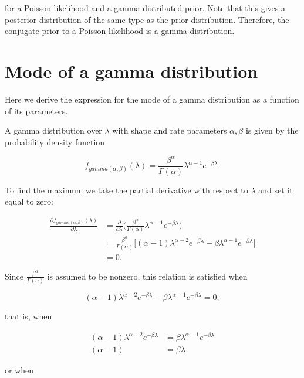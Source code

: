 \documentclass[12pt]{article}
\begin{document}
for a Poisson likelihood and a gamma-distributed prior. Note that this gives a posterior distribution of the same type as the prior distribution. Therefore, the conjugate prior to a Poisson likelihood is a gamma distribution.

\section{Mode of a gamma distribution}
\label{a:mode_derivation}
Here we derive the expression for the mode of a gamma distribution as a function of its parameters.

A gamma distribution over $\lambda$ with shape and rate parameters $\alpha,\beta$ is given by the probability density function

\begin{equation}
f_{gamma(\alpha,\beta)}(\lambda) = \frac{\beta^{\alpha}}{\Gamma(\alpha)} \lambda^{\alpha - 1} e^{-\beta\lambda}.
\end{equation}

To find the maximum we take the partial derivative with respect to $\lambda$ and set it equal to zero:

\begin{align}
\frac{\partial f_{gamma(\alpha,\beta)}(\lambda)}{\partial \lambda} &= \frac{\partial}{\partial \lambda} \Big(\frac{\beta^{\alpha}}{\Gamma(\alpha)} \lambda^{\alpha - 1} e^{-\beta\lambda}\Big) \\[5pt]
&= \frac{\beta^{\alpha}}{\Gamma(\alpha)} \Big[(\alpha - 1)\lambda^{\alpha - 2} e^{-\beta\lambda} - \beta\lambda^{\alpha - 1} e^{-\beta\lambda}\Big] \\[5pt]
&= 0.
\end{align}

Since $\frac{\beta^{\alpha}}{\Gamma(\alpha)}$ is assumed to be nonzero, this relation is satisfied when

\begin{equation}
(\alpha - 1)\lambda^{\alpha - 2} e^{-\beta\lambda} - \beta\lambda^{\alpha - 1} e^{-\beta\lambda} = 0;
\end{equation}

that is, when

\begin{align}
(\alpha - 1)\lambda^{\alpha - 2} e^{-\beta\lambda} &= \beta\lambda^{\alpha - 1} e^{-\beta\lambda} \\[5pt]
(\alpha - 1) &= \beta\lambda
\end{align}

or when
\end{document}
